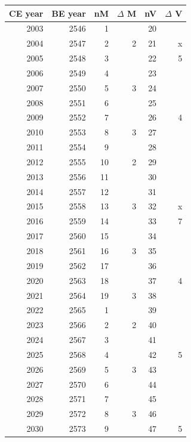 \documentclass[11pt,oneside]{memoir-article}
\begin{document}
\begin{table}[h]
\begin{fullwidth}
\begin{multicols}{2}
\columnbreak

\begin{center}
\begin{tabular}{rrrrrr}
CE year & BE year & nM & $\Delta$ M & nV & $\Delta$ V\\
\hline
2003 & 2546 & 1 &  & 20 & \\
2004 & 2547 & 2 & 2 & 21 & x\\
2005 & 2548 & 3 &  & 22 & 5\\
2006 & 2549 & 4 &  & 23 & \\
2007 & 2550 & 5 & 3 & 24 & \\
2008 & 2551 & 6 &  & 25 & \\
2009 & 2552 & 7 &  & 26 & 4\\
2010 & 2553 & 8 & 3 & 27 & \\
2011 & 2554 & 9 &  & 28 & \\
2012 & 2555 & 10 & 2 & 29 & \\
2013 & 2556 & 11 &  & 30 & \\
2014 & 2557 & 12 &  & 31 & \\
2015 & 2558 & 13 & 3 & 32 & x\\
2016 & 2559 & 14 &  & 33 & 7\\
2017 & 2560 & 15 &  & 34 & \\
2018 & 2561 & 16 & 3 & 35 & \\
2019 & 2562 & 17 &  & 36 & \\
2020 & 2563 & 18 &  & 37 & 4\\
2021 & 2564 & 19 & 3 & 38 & \\
2022 & 2565 & 1 &  & 39 & \\
2023 & 2566 & 2 & 2 & 40 & \\
2024 & 2567 & 3 &  & 41 & \\
2025 & 2568 & 4 &  & 42 & 5\\
2026 & 2569 & 5 & 3 & 43 & \\
2027 & 2570 & 6 &  & 44 & \\
2028 & 2571 & 7 &  & 45 & \\
2029 & 2572 & 8 & 3 & 46 & \\
2030 & 2573 & 9 &  & 47 & 5\\
\end{tabular}
\end{center}

\end{multicols}
\end{fullwidth}
\end{table}
\end{document}
